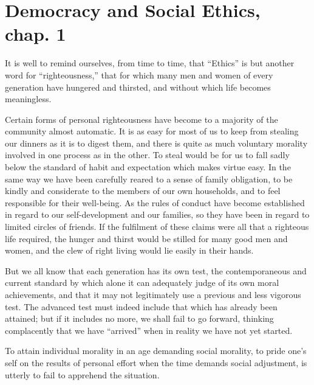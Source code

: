 
\author{Jane Addams}
\chapter[Jane Addams -- Democracy and Social Ethics, chap.
1]{Democracy and Social Ethics, chap. 1}



It is well to remind ourselves, from time to time, that
``Ethics'' is but another word for ``righteousness,'' that for which
many men and women of every generation have hungered and thirsted, and
without which life becomes meaningless.

Certain forms of personal righteousness have become to a majority of
the community almost automatic. It is as easy for most of us to keep
from stealing our dinners as it is to digest them, and there is quite
as much voluntary morality involved in one process as in the other. To
steal would be for us to fall sadly below the standard of habit and
expectation which makes virtue easy. In the same way we have been
carefully reared to a sense  of family obligation, to be
kindly and considerate to the members of our own households, and to
feel responsible for their well-being. As the rules of conduct have
become established in regard to our self-development and our families,
so they have been in regard to limited circles of friends. If the
fulfilment of these claims were all that a righteous life required,
the hunger and thirst would be stilled for many good men and women,
and the clew of right living would lie easily in their hands.

But we all know that each generation has its own test, the
contemporaneous and current standard by which alone it can adequately
judge of its own moral achievements, and that it may not legitimately
use a previous and less vigorous test. The advanced test must indeed
include that which has already been attained; but if it includes no
more, we shall fail to go forward, thinking complacently that we have
``arrived'' when in reality we have not yet started.

To attain individual morality in an age  demanding social
morality, to pride one's self on the results of personal effort when
the time demands social adjustment, is utterly to fail to apprehend
the situation.

